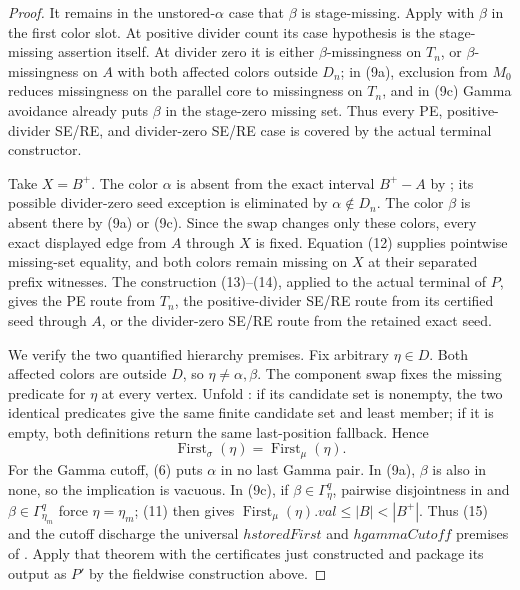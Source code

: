 \begin{proof}
It remains in the unstored-\(\alpha\) case that \(\beta\) is
stage-missing.  Apply  with \(\beta\) in
the first color slot.  At positive divider count its case hypothesis is
the stage-missing assertion itself.  At divider zero it is either
\(\beta\)-missingness on \(T_n\), or \(\beta\)-missingness on \(A\) with
both affected colors outside \(D_n\); in (9a), exclusion from \(M_0\)
reduces missingness on the parallel core to missingness on \(T_n\), and
in (9c) Gamma avoidance already puts \(\beta\) in the stage-zero missing
set.  Thus every PE, positive-divider SE/RE, and divider-zero SE/RE case
is covered by the actual terminal constructor.

Take \(X=B^+\).  The color \(\alpha\) is absent from the exact interval
\(B^+-A\) by ; its possible
divider-zero seed exception is eliminated by \(\alpha\notin D_n\).
The color \(\beta\) is absent there by (9a) or (9c).  Since the swap
changes only these colors, every exact displayed edge from \(A\) through
\(X\) is fixed.  Equation (12) supplies pointwise missing-set equality,
and both colors remain missing on \(X\) at their separated prefix
witnesses.  The construction (13)--(14), applied to the actual terminal
 of \(P\), gives the PE route from \(T_n\),
the positive-divider SE/RE route from its certified seed through \(A\),
or the divider-zero SE/RE route from the retained exact seed.

We verify the two quantified hierarchy premises.  Fix arbitrary
\(\eta\in D\).  Both affected colors are outside \(D\), so
\(\eta\ne\alpha,\beta\).  The component swap fixes the missing predicate
for \(\eta\) at every vertex.  Unfold
: if its candidate set is
nonempty, the two identical predicates give the same finite candidate
set and least member; if it is empty, both definitions return the same
last-position fallback.  Hence
\[
 \operatorname{First}_{\sigma}(\eta)
                         =\operatorname{First}_{\mu}(\eta).  \tag{15}
\]
For the Gamma cutoff, (6) puts \(\alpha\) in no last Gamma pair.  In
(9a), \(\beta\) is also in none, so the implication is vacuous.  In
(9c), if \(\beta\in\Gamma^q_\eta\), pairwise disjointness in
 and
\(\beta\in\Gamma^q_{\eta_m}\) force \(\eta=\eta_m\); (11) then gives
\(\operatorname{First}_{\mu}(\eta).\mathit{val}\leq|B|<|B^+|\).
Thus (15) and the cutoff discharge the universal \(hstoredFirst\) and
\(hgammaCutoff\) premises of
.  Apply that theorem with the
certificates just constructed and package its output as \(P'\) by the
fieldwise construction above.


\end{proof}
